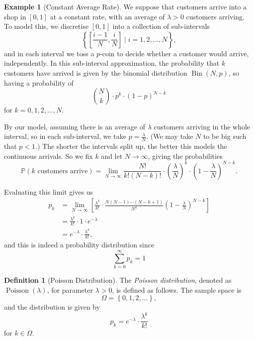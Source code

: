 \documentclass[11pt]{article}
\numberwithin{equation}{section}
\theoremstyle{definition}
\newtheorem{definition}[theorem]{Definition}
\newtheorem{example}[theorem]{Example}
\theoremstyle{remark}
\newcommand{\pqty}[1]{\left(#1\right)}
\newcommand{\bqty}[1]{\left[#1\right]}
\newcommand{\Bqty}[1]{\left\{#1\right\}}
\newcommand{\set}[2]{\left\{#1\mid #2\right\}}
\newcommand{\ccintv}[2]{[#1,#2]}
\newcommand{\Prob}{\mathbb P}
\newcommand{\Binomial}{\operatorname{Bin}}
\newcommand{\Poisson}{\operatorname{Poisson}}
\begin{document}
\begin{example}[Constant Average Rate]\label{probability-example-018}
    We suppose that customers arrive into a shop in \(\ccintv{0}{1}\) at a constant rate, with an average of \(\lambda > 0\) customers arriving. To model this, we discretise \(\ccintv{0}{1}\) into a collection of sub-intervals
    \[
        \set{\ccintv{\frac{i - 1}{N}}{\frac{i}{N}}}{i = 1, 2, \ldots, N},
    \]
    and in each interval we toss a \(p\)-coin to decide whether a customer would arrive, independently. In this sub-interval approximation, the probability that \(k\) customers have arrived is given by the binomial distribution \(\Binomial\pqty{N, p}\), so having a probability of
    \[
        \binom{N}{k} \cdot p^k \cdot \pqty{1 - p}^{N - k}
    \]
    for \(k = 0, 1, 2, \ldots, N\).

    By our model, assuming there is an average of \(\lambda\) customers arriving in the whole interval, so in each sub-interval, we take \(p = \frac{\lambda}{N}\). (We may take \(N\) to be big such that \(p < 1\).) The shorter the intervals split up, the better this models the continuous arrivals. So we fix \(k\) and let \(N \to \infty\), giving the probabilities
    \[
        \Prob\pqty{k\text{ customers arrive}} = \lim_{N \to \infty} \frac{N!}{k! \pqty{N - k}!} \cdot \pqty{\frac{\lambda}{N}}^k \cdot \pqty{1 - \frac{\lambda}{N}}^{N - k}.
    \]

    Evaluating this limit gives us
    \begin{align*}
        p_k &= \lim_{N \to \infty} \bqty{\frac{\lambda^k}{k!} \cdot \frac{N \pqty{N - 1} \cdots \pqty{N - k + 1}}{N^k} \pqty{1 - \frac{\lambda}{N}}^{N - k}}\\
        &= \frac{\lambda^k}{k!} \cdot 1 \cdot e^{-\lambda} \\
        &= e^{-\lambda} \cdot \frac{\lambda^{k}}{k!},
    \end{align*}
    and this is indeed a probability distribution since
    \[
        \sum_{k = 0}^{\infty} p_k = 1
    \]
\end{example}

\begin{definition}[Poisson Distribution]\label{probability-definition-015}
    \label{probability-def:poisson-distribution}%
    The \emph{Poisson distribution}, denoted as \(\Poisson\pqty{\lambda}\), for parameter \(\lambda > 0\), is defined as follows. The sample space is
    \[
        \Omega = \Bqty{0, 1, 2, \ldots},
    \]
    and the distribution is given by
    \[
        p_k = e^{-\lambda} \cdot \frac{\lambda^k}{k!}
    \]
    for \(k \in \Omega\).
\end{definition}
\end{document}
